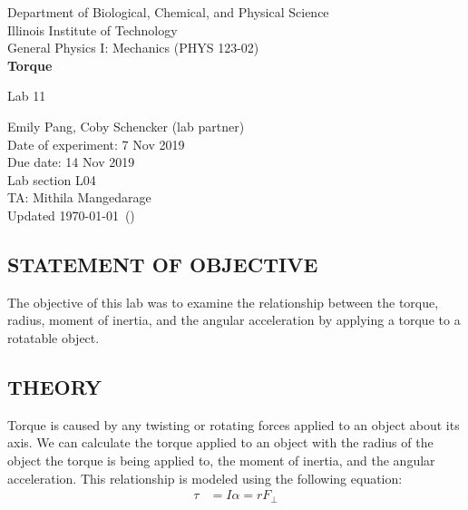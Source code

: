 \documentclass [12pt, letterpaper, twoside] {article}
\begin{document}
\pgfplotsset{compat=1.16}

\begin {titlepage}
\begin {center}
Department of Biological, Chemical, and Physical Science\\
\vspace {0.1cm}
Illinois Institute of Technology\\
\vspace {0.1cm}
General Physics I: Mechanics (PHYS 123-02)\\
\vspace* {\fill}
\begingroup
\Large
\textbf {Torque}
\vspace {0.35cm}

\normalsize
Lab 11
\vspace {1.5cm}
\endgroup
\vspace* {\fill}
\end {center}

\vspace*{\fill}
\begin {flushright}
\footnotesize
Emily Pang, Coby Schencker (lab partner)\\
Date of experiment: 7 Nov 2019\\
Due date: 14 Nov 2019\\
Lab section L04\\
TA: Mithila Mangedarage\\
Updated \usdate\today~(\currenttime)
\end {flushright}
\end {titlepage}
\pgfplotsset{compat=1.7}
\subsection* {STATEMENT OF OBJECTIVE}
The objective of this lab was to examine the relationship between the torque, radius, moment of inertia, and the angular acceleration by applying a torque to a rotatable object.

\subsection* {THEORY}
\noindent
Torque is caused by any twisting or rotating forces applied to an object about its axis. We can calculate the torque applied to an object with the radius of the object the torque is being applied to, the moment of inertia, and the angular acceleration. This relationship is modeled using the following equation:
\begin {equation}
  \begin {split}  
    \tau &= I\alpha = rF_{\perp} \\
  \end {split}
\end {equation}
\end{document}
